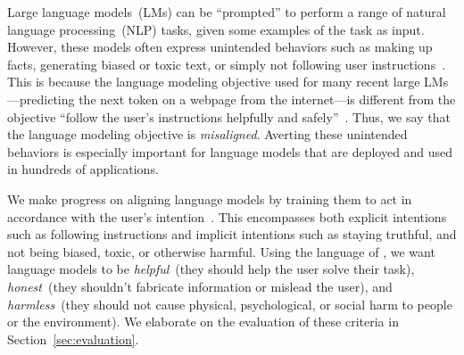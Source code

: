 \documentclass{article}
\begin{document}
Large language models~(LMs) can be ``prompted'' to perform a range of natural language processing~(NLP) tasks, given some examples of the task as input. However, these models often express unintended behaviors such as making up facts, generating biased or toxic text, or simply not following user instructions~\citep{bender2021dangers,bommasani2021opportunities,kenton2021alignment,weidinger2021ethical,tamkin2021understanding,gehman2020realtoxicityprompts}. This is because the language modeling objective used for many recent large LMs---predicting the next token on a webpage from the internet---is different from the objective ``follow the user's instructions helpfully and safely''~\citep{radford2019language,brown2020language,fedus2021switch,rae2021scaling,thoppilan2022lamda}. Thus, we say that the language modeling objective is \textit{misaligned}. Averting these unintended behaviors is especially important for language models that are deployed and used in hundreds of applications.

We make progress on aligning language models by training them to act in accordance with the user's intention~\citep{leike2018scalable}. This encompasses both explicit intentions such as following instructions and implicit intentions such as staying truthful, and not being biased, toxic, or otherwise harmful. Using the language of \citet{askell2021general}, we want language models to be \textit{helpful}~(they should help the user solve their task), \textit{honest}~(they shouldn't fabricate information or mislead the user), and \textit{harmless}~(they should not cause physical, psychological, or social harm to people or the environment). We elaborate on the evaluation of these criteria in Section~\ref{sec:evaluation}.
\end{document}
